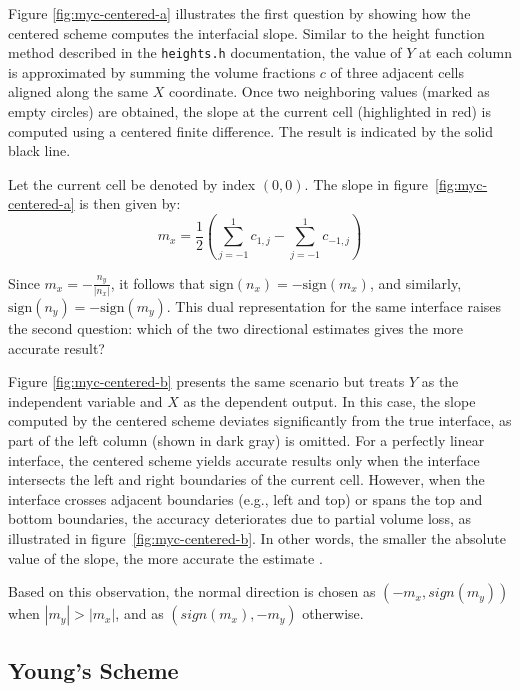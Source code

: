 Figure \ref{fig:myc-centered-a} illustrates the first question by showing how the centered scheme computes the interfacial slope. Similar to the height function method described in the \texttt{heights.h} documentation, the value of $Y$ at each column is approximated by summing the volume fractions $c$ of three adjacent cells aligned along the same $X$ coordinate. Once two neighboring values (marked as empty circles) are obtained, the slope at the current cell (highlighted in red) is computed using a centered finite difference. The result is indicated by the solid black line.

Let the current cell be denoted by index $(0, 0)$. The slope in figure~\ref{fig:myc-centered-a} is then given by:
\begin{equation}\label{equ:myc-dcentered}
m_x = \frac{1}{2} \left(\sum_{j=-1}^{1} c_{1,j} - \sum_{j=-1}^{1} c_{-1,j} \right)
\end{equation}

Since $m_x = -\frac{n_y}{|n_x|}$, it follows that $\text{sign}(n_x) = -\text{sign}(m_x)$, and similarly, $\text{sign}(n_y) = -\text{sign}(m_y)$. This dual representation for the same interface raises the second question: which of the two directional estimates gives the more accurate result?

Figure \ref{fig:myc-centered-b} presents the same scenario but treats $Y$ as the independent variable and $X$ as the dependent output. In this case, the slope computed by the centered scheme deviates significantly from the true interface, as part of the left column (shown in dark gray) is omitted. For a perfectly linear interface, the centered scheme yields accurate results only when the interface intersects the left and right boundaries of the current cell. However, when the interface crosses adjacent boundaries (e.g., left and top) or spans the top and bottom boundaries, the accuracy deteriorates due to partial volume loss, as illustrated in figure~\ref{fig:myc-centered-b}. In other words, the smaller the absolute value of the slope, the more accurate the estimate \cite{2007_Aulisa}.

Based on this observation, the normal direction is chosen as $(-m_x, sign(m_y))$ when $|m_y| > |m_x|$, and as $(sign(m_x), -m_y)$ otherwise.

\subsection{Young's Scheme}


